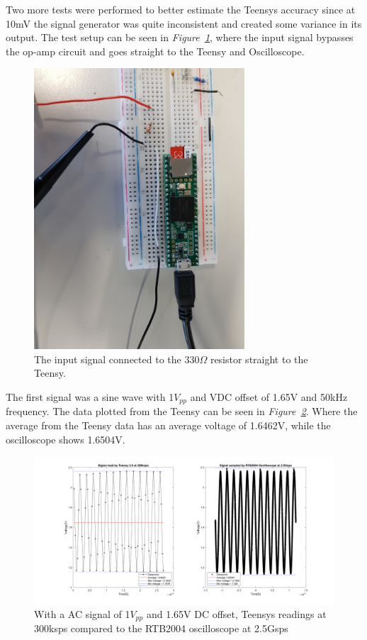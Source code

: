 Two more tests were performed to better estimate the Teensys accuracy since at 10mV the signal generator was quite inconsistent and created some variance in its output. 
The test setup can be seen in \textit{Figure~\ref{fig:Last2TestsSetup}}, where the input signal bypasses the op-amp circuit and goes straight to the Teensy and Oscilloscope.

\begin{figure}[h]
    \centering
    \includegraphics[width=0.7\textwidth]{graphics/Last2Tests.jpg}
    \caption{The input signal connected to the 330$\Omega$ resistor straight to the Teensy.}
    \label{fig:Last2TestsSetup}
\end{figure}

\vspace{4cm}


The first signal was a sine wave with 1$V_{pp}$ and VDC offset of 1.65V and 50kHz frequency.
The data plotted from the Teensy can be seen in \textit{Figure~\ref{fig:OscilloCompTeensyAC}}.
Where the average from the Teensy data has an average voltage of 1.6462V, while the oscilloscope shows 1.6504V.

\begin{figure}[h]
    \centering
    \includegraphics[width=1.0\textwidth]{graphics/OscilloTeensyAC50k1vpp165voffpng.png}
    \caption{With a AC signal of 1$V_{pp}$ and 1.65V DC offset, Teensys readings at 300ksps compared to the RTB2004 oscilloscope at 2.5Gsps}
    \label{fig:OscilloCompTeensyAC}
\end{figure}

